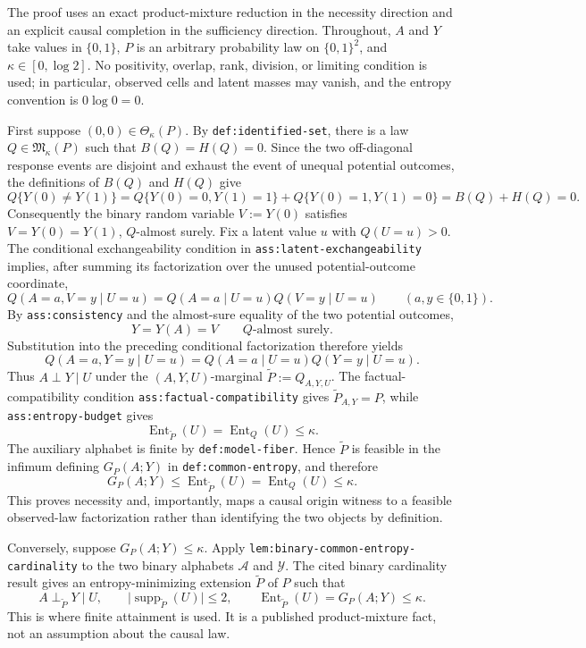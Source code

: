 The proof uses an exact product-mixture reduction in the necessity direction and an explicit causal completion in the sufficiency direction.  Throughout, \(A\) and \(Y\) take values in \(\{0,1\}\), \(P\) is an arbitrary probability law on \(\{0,1\}^2\), and \(\kappa\in[0,\log 2]\).  No positivity, overlap, rank, division, or limiting condition is used; in particular, observed cells and latent masses may vanish, and the entropy convention is \(0\log 0=0\).

First suppose \((0,0)\in\Theta_\kappa(P)\).  By \texttt{def:identified-set}, there is a law \(Q\in\mathfrak M_\kappa(P)\) such that \(B(Q)=H(Q)=0\).  Since the two off-diagonal response events are disjoint and exhaust the event of unequal potential outcomes, the definitions of \(B(Q)\) and \(H(Q)\) give
\[
Q\{Y(0)\neq Y(1)\}
=Q\{Y(0)=0,Y(1)=1\}+Q\{Y(0)=1,Y(1)=0\}
=B(Q)+H(Q)=0.
\]
Consequently the binary random variable \(V:=Y(0)\) satisfies \(V=Y(0)=Y(1)\), \(Q\)-almost surely.  Fix a latent value \(u\) with \(Q(U=u)>0\).  The conditional exchangeability condition in \texttt{ass:latent-exchangeability} implies, after summing its factorization over the unused potential-outcome coordinate,
\[
Q(A=a,V=y\mid U=u)
=Q(A=a\mid U=u)Q(V=y\mid U=u)
\qquad(a,y\in\{0,1\}).
\]
By \texttt{ass:consistency} and the almost-sure equality of the two potential outcomes,
\[
Y=Y(A)=V\qquad Q\text{-almost surely}.
\]
Substitution into the preceding conditional factorization therefore yields
\[
Q(A=a,Y=y\mid U=u)
=Q(A=a\mid U=u)Q(Y=y\mid U=u).
\]
Thus \(A\perp Y\mid U\) under the \((A,Y,U)\)-marginal \(\widetilde P:=Q_{A,Y,U}\).  The factual-compatibility condition \texttt{ass:factual-compatibility} gives \(\widetilde P_{A,Y}=P\), while \texttt{ass:entropy-budget} gives
\[
\operatorname{Ent}_{\widetilde P}(U)=\operatorname{Ent}_{Q}(U)\leq\kappa.
\]
The auxiliary alphabet is finite by \texttt{def:model-fiber}.  Hence \(\widetilde P\) is feasible in the infimum defining \(G_P(A;Y)\) in \texttt{def:common-entropy}, and therefore
\[
G_P(A;Y)\leq \operatorname{Ent}_{\widetilde P}(U)
=\operatorname{Ent}_{Q}(U)\leq\kappa.
\]
This proves necessity and, importantly, maps a causal origin witness to a feasible observed-law factorization rather than identifying the two objects by definition.

Conversely, suppose \(G_P(A;Y)\leq\kappa\).  Apply \texttt{lem:binary-common-entropy-cardinality} to the two binary alphabets \(\mathcal A\) and \(\mathcal Y\).  The cited binary cardinality result gives an entropy-minimizing extension \(\widetilde P\) of \(P\) such that
\[
A\perp_{\widetilde P}Y\mid U,
\qquad
\bigl|\operatorname{supp}_{\widetilde P}(U)\bigr|\leq2,
\qquad
\operatorname{Ent}_{\widetilde P}(U)=G_P(A;Y)\leq\kappa.
\]
This is where finite attainment is used.  It is a published product-mixture fact, not an assumption about the causal law.

